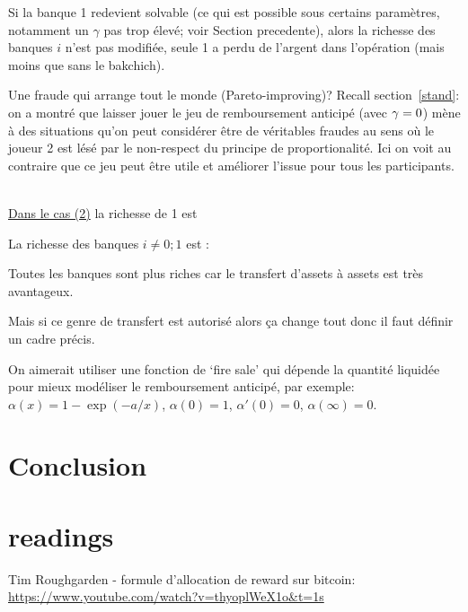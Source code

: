 \documentclass[11pt,oneside,twocolumn]{article}
\begin{document}
Si la banque 1 redevient solvable (ce qui est possible sous certains paramètres, notamment un $\gamma$ pas trop élevé; voir Section precedente), alors la richesse des banques $i$ n'est pas modifiée, seule 1 a perdu de l'argent dans l'opération (mais moins que sans le bakchich).

Une fraude qui arrange tout le monde (Pareto-improving)?
Recall section~\ref{stand}: on a montré que laisser jouer le jeu de remboursement anticipé (avec $\gamma=0$)
mène à des situations qu'on peut considérer être de véritables fraudes au sens où le joueur 2 est lésé par le non-respect du principe de proportionalité. Ici on voit au contraire que ce jeu peut être utile et améliorer l'issue pour tous les participants.
\

\underline{Dans le cas (2)} la richesse de 1 est


La richesse des banques $i\neq 0; 1$ est :


Toutes les banques sont plus riches car le transfert d'assets à assets est très avantageux.

Mais si ce genre de transfert est autorisé alors ça change tout donc il faut définir un cadre précis.

On aimerait utiliser une fonction de `fire sale' qui dépende la quantité liquidée pour mieux modéliser le remboursement anticipé, par exemple:
$\alpha(x) = 1 - \exp(-a/x)$,
$\alpha(0)=1$,
$\alpha'(0)=0$,
$\alpha(\infty)=0$.


\section{Conclusion}
































\section{readings}

Tim Roughgarden - formule d'allocation de reward sur bitcoin: \url{https://www.youtube.com/watch?v=thyoplWeX1o&t=1s}
\end{document}
